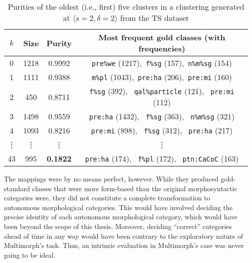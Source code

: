 \begin{table}[tb]
\centering
\setlength{\extrarowheight}{6pt}
\begin{tabular}{cccc}
\toprule
$k$ &  Size & Purity & Most frequent gold classes (with frequencies) \\
\midrule
0 & 1218 & 0.9992 & \texttt{pre\%we} (1217),\, \texttt{f\%sg} (157), \,\texttt{n\%m\%sg} (154) \\
1 & 1111 & 0.9388 & \texttt{m\%pl} (1043), \,\texttt{pre:ha} (206), \,\texttt{pre:mi} (160) \\
2 & 450 & 0.8711 & \texttt{f\%sg} (392), \, \texttt{qal\%particle} (121), \, \texttt{pre:mi} (112) \\
3 & 1498 & 0.9559 & \texttt{pre:ha} (1432), \, \texttt{f\%sg} (363), \, \texttt{n\%m\%sg} (321) \\
4 & 1093 & 0.8216 & \texttt{pre:mi} (898), \, \texttt{f\%sg} (312), \, \texttt{pre:ha} (217) \\
\vdots & \vdots & \vdots & \vdots \\
43 & 995 & \textbf{0.1822} & \texttt{pre:ha} (174), \, \texttt{f\%pl}  (172), \, \texttt{ptn:CaCoC} (163) \\
\bottomrule
\end{tabular}
\caption{Purities of the oldest (i.e., first) five clusters in a clustering generated at $\langle{s} = 2, \delta = 2\rangle$ from the TS dataset}
\label{tab:best-purities}
\end{table}

The mappings were by no means perfect, however. While they produced gold-standard classes that were more
form-based than the original morphosyntactic categories were, they did not constitute a complete transformation
to autonomous morphological categories. This would have involved deciding the precise identity of each autonomous 
morphological category, which would have been beyond the scope of this thesis. Moreover, deciding ``correct'' 
categories ahead of time in any way would have been contrary to the exploratory nature of Multimorph's task. 
Thus, an intrinsic evaluation in Multimorph's case was never going to be ideal.


